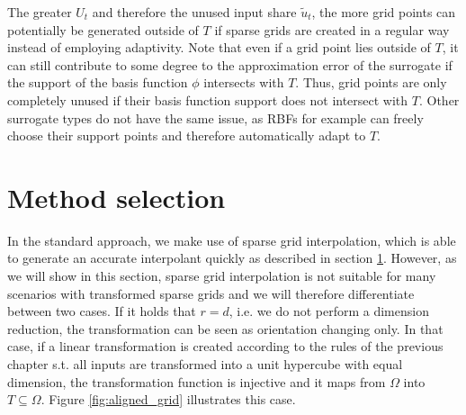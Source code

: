 \documentclass[
  a4paper,  %
  twoside,  %
  bibliography=totoc,
  headsepline,
  cleardoublepage=empty,
  parskip=half,
  draft=false
]{scrbook}
\begin{document}
The greater $U_t$ and therefore the unused input share $\tilde{u}_t$, the more grid points can potentially be generated outside of $T$ if sparse grids are created in a regular way instead of employing adaptivity.
Note that even if a grid point lies outside of $T$, it can still contribute to some degree to the approximation error of the surrogate if the support of the basis function $\phi$ intersects with $T$.
Thus, grid points are only completely unused if their basis function support does not intersect with $T$.
Other surrogate types do not have the same issue, as RBFs for example can freely choose their support points and therefore automatically adapt to $T$.


\section{Method selection}

In the standard approach, we make use of sparse grid interpolation, which is able to generate an accurate interpolant quickly as described in section \ref{}.
However, as we will show in this section, sparse grid interpolation is not suitable for many scenarios with transformed sparse grids and we will therefore differentiate between two cases.
If it holds that $r=d$, i.e. we do not perform a dimension reduction, the transformation can be seen as orientation changing only.
In that case, if a linear transformation is created according to the rules of the previous chapter s.t. all inputs are transformed into a unit hypercube with equal dimension, the transformation function is injective and it maps from $\Omega$ into $T \subseteq \Omega$.
Figure \ref{fig:aligned_grid} illustrates this case.
\end{document}
